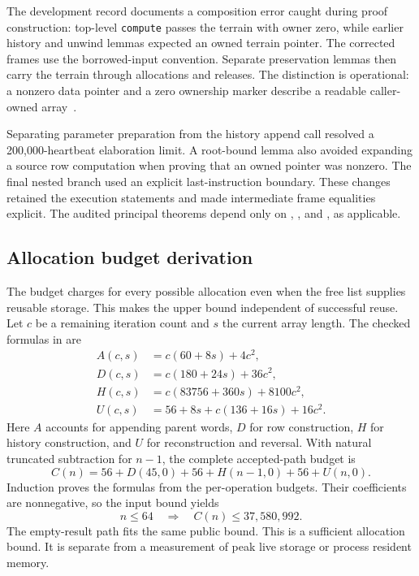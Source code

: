 \documentclass[11pt]{article}
\begin{document}
The development record documents a composition error caught during proof construction: top-level \textup{\texttt{compute}} passes the terrain with owner zero, while earlier history and unwind lemmas expected an owned terrain pointer.  The corrected frames use the borrowed-input convention.  Separate preservation lemmas then carry the terrain through allocations and releases.  The distinction is operational: a nonzero data pointer and a zero ownership marker describe a readable caller-owned array~\cite{drone-record}.

Separating parameter preparation from the history append call resolved a 200,000-heartbeat elaboration limit.  A root-bound lemma also avoided expanding a source row computation when proving that an owned pointer was nonzero.  The final nested branch used an explicit last-instruction boundary.  These changes retained the execution statements and made intermediate frame equalities explicit.  The audited principal theorems depend only on , , and , as applicable.

\subsection{Allocation budget derivation}

The budget charges for every possible allocation even when the free list supplies reusable storage.  This makes the upper bound independent of successful reuse.  Let $c$ be a remaining iteration count and $s$ the current array length.  The checked formulas in  are
\begin{align*}
 A(c,s)&=c(60+8s)+4c^2,\\
 D(c,s)&=c(180+24s)+36c^2,\\
 H(c,s)&=c(83756+360s)+8100c^2,\\
 U(c,s)&=56+8s+c(136+16s)+16c^2.
\end{align*}
Here $A$ accounts for appending parent words, $D$ for row construction, $H$ for history construction, and $U$ for reconstruction and reversal.  With natural truncated subtraction for $n-1$, the complete accepted-path budget is
\[
 C(n)=56+D(45,0)+56+H(n-1,0)+56+U(n,0).
\]
Induction proves the formulas from the per-operation budgets.  Their coefficients are nonnegative, so the input bound yields
\[
 n\leq64\quad\Longrightarrow\quad C(n)\leq37{,}580{,}992.
\]
The empty-result path fits the same public bound.  This is a sufficient allocation bound.  It is separate from a measurement of peak live storage or process resident memory.
\end{document}
